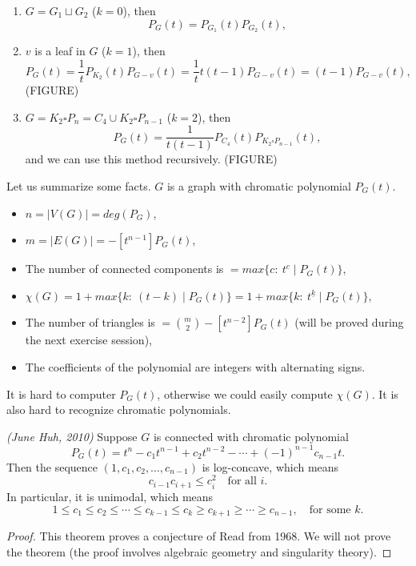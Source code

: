 \begin{example}
\begin{enumerate}
\item $G=G_1 \sqcup G_2$ ($k=0$), then $$P_G(t)=P_{G_1}(t)P_{G_2}(t),$$
\item $v$ is a leaf in $G$ ($k=1$), then $$P_G(t)=\frac{1}{t}P_{K_2}(t)P_{G-v}(t)=\frac{1}{t}t(t-1)P_{G-v}(t)=(t-1)P_{G-v}(t),$$
(FIGURE)
\item $G= K_2 \square P_n= C_4 \cup K_2 \square P_{n-1}$ ($k=2$), then $$P_G(t)=\frac{1}{t(t-1)}P_{C_4}(t)P_{K_2 \square P_{n-1}}(t),$$ and we can use this method recursively.
(FIGURE)
\end{enumerate}
\end{example}

Let us summarize some facts. $G$ is a graph with chromatic polynomial $P_G(t)$.
\begin{itemize}
\item $n=|V(G)|=deg(P_G)$,
\item $m=|E(G)|=-[t^{n-1}]P_G(t)$,
\item The number of connected components is $=max \{c: \ t^c \mid P_G(t) \}$,
\item $\chi(G) = 1+ max \{k: \ (t-k) \mid P_G(t) \}=1+ max \{k: \ t^{\underline{k}} \mid P_G(t) \}$,
\item The number of triangles is $={m \choose 2}-[t^{n-2}]P_G(t)$ (will be proved during the next exercise session),
\item The coefficients of the polynomial are integers with alternating signs.
\end{itemize}

\begin{remark} It is hard to computer $P_G(t)$, otherwise we could easily compute $\chi(G)$. It is also hard to recognize chromatic polynomials.
\end{remark}

\begin{theorem} \emph{(June Huh, 2010)}
Suppose $G$ is connected with chromatic polynomial
$$P_G(t)=t^n-c_1t^{n-1}+c_2t^{n-2}-\cdots +(-1)^{n-1}c_{n-1}t.$$
Then the sequence $(1,c_1,c_2,\dots,c_{n-1})$ is log-concave, which means
$$c_{i-1}c_{i+1}\leqslant c_i^2 \quad \text{for all } i.$$
In particular, it is unimodal, which means
$$1 \leqslant c_1 \leqslant c_2 \leqslant \cdots \leqslant c_{k-1} \leqslant c_k \geqslant c_{k+1} \geqslant \cdots \geqslant c_{n-1}, \quad \text{for some } k.$$
\end{theorem}

\begin{proof}
This theorem proves a conjecture of Read from 1968. We will not prove the theorem (the proof involves algebraic geometry and singularity theory).
\end{proof}

